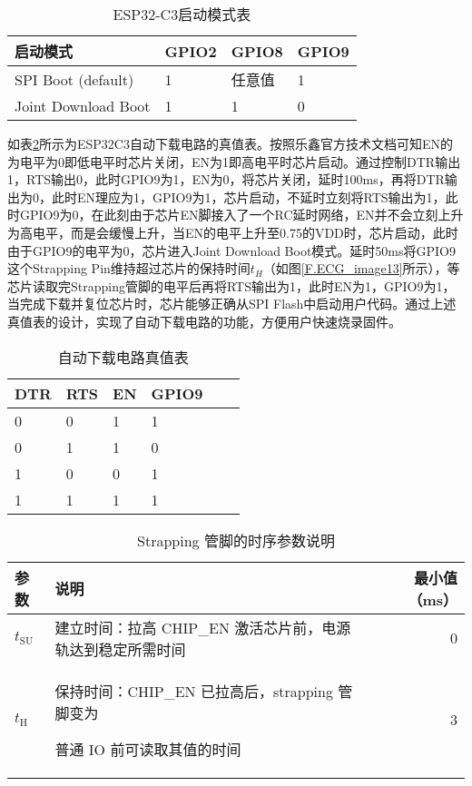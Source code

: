 \begin{table}[htb]
    \centering
    \caption{ESP32-C3启动模式表}
    \label{T.ESP32C3-startmode}
    \begin{tabular}{llll}
    \hline
    启动模式 & GPIO2 & GPIO8 & GPIO9 \\
    \hline
    SPI Boot (default) & 1 & 任意值 & 1 \\
    \hline
    Joint Download Boot & 1 & 1 & 0 \\
    \hline
\end{tabular}
\end{table}

如表\ref{T.ESP32C3-autodownload}所示为ESP32C3自动下载电路的真值表。按照乐鑫官方技术文档\cite{espressif2021esp32c3}可知EN的为电平为0即低电平时芯片关闭，EN为1即高电平时芯片启动。通过控制DTR输出1，RTS输出0，此时GPIO9为1，EN为0，将芯片关闭，延时100ms，再将DTR输出为0，此时EN理应为1，GPIO9为1，芯片启动，不延时立刻将RTS输出为1，此时GPIO9为0，在此刻由于芯片EN脚接入了一个RC延时网络，EN并不会立刻上升为高电平，而是会缓慢上升，当EN的电平上升至0.75的VDD时，芯片启动，此时由于GPIO9的电平为0，芯片进入Joint Download Boot模式。延时50ms将GPIO9这个Strapping Pin维持超过芯片的保持时间$t_H$（如图\ref{F.ECG_image13}所示），等芯片读取完Strapping管脚的电平后再将RTS输出为1，此时EN为1，GPIO9为1，当完成下载并复位芯片时，芯片能够正确从SPI Flash中启动用户代码。通过上述真值表的设计，实现了自动下载电路的功能，方便用户快速烧录固件。

\begin{table}[htb]
    \centering
    \caption{自动下载电路真值表}
    \label{T.ESP32C3-autodownload}
    \begin{tabular}{llllll}
    \hline
    DTR & RTS & EN & GPIO9 \\
    \hline
    0 & 0 & 1 & 1 \\
    \hline
    0 & 1 & 1 & 0 \\
    \hline
    1 & 0 & 0 & 1 \\
    \hline
    1 & 1 & 1 & 1 \\
    \hline
\end{tabular}
\end{table}

\begin{table}[htb]
    \centering
    \caption{Strapping 管脚的时序参数说明}
    \label{T.ESP32C3-strapping}
    \begin{tabular}{|l| p{8cm} |r|} %
    \hline
    \textbf{参数} & \textbf{说明} & \textbf{最小值（ms）} \\
    \hline
    $t_{\mathrm{SU}}$ & 建立时间：拉高 CHIP\_EN 激活芯片前，电源轨达到稳定所需时间 & 0 \\
    \hline
    $t_{\mathrm{H}}$ & 保持时间：CHIP\_EN 已拉高后，strapping 管脚变为
    
    普通 IO 前可读取其值的时间 & 3 \\
    \hline
    \end{tabular}
\end{table}

